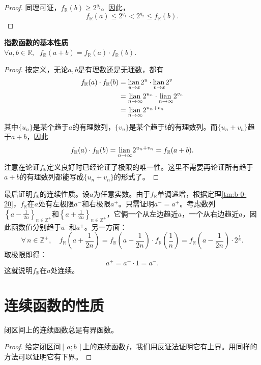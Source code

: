 \documentclass[12pt,UTF8]{ctexbook}
\begin{document}
\begin{appendix}
\begin{proof}
    同理可证，$f_{\mathbb{R}} (b)\geqslant 2^{q_2}$。因此，
    $$ f_{\mathbb{R}} (a)\leqslant 2^{q_1} < 2^{q_2} \leqslant f_{\mathbb{R}} (b). $$
\end{proof}

\begin{tm}{\textbf{指数函数的基本性质}}\\
    $ \forall a, b \in \mathbb{R}, \;\,\, f_{\mathbb{R}}(a + b) = f_{\mathbb{R}}(a) \cdot f_{\mathbb{R}}(b).$
\end{tm}

\begin{proof}
    按定义，无论$a,b$是有理数还是无理数，都有
    \begin{align*}
         f_{\mathbb{R}}(a) \cdot f_{\mathbb{R}}(b) &= \underset{u \to x}{\operatorname{lian}\,} 2^u \cdot \underset{v \to x}{\operatorname{lian}\,} 2^v \\
         &= \underset{n\to\infty}{\operatorname{lian}\,} 2^{u_n} \cdot \underset{n\to\infty}{\operatorname{lian}\,} 2^{v_n} \\
         &= \underset{n\to\infty}{\operatorname{lian}\,} 2^{u_n+v_n}
    \end{align*}
    其中$\{u_n\}$是某个趋于$a$的有理数列，$\{v_n\}$是某个趋于$b$的有理数列。而$\{u_n+v_n\}$趋于$a+b$，因此
    $$f_{\mathbb{R}}(a) \cdot f_{\mathbb{R}}(b) = \underset{n\to\infty}{\operatorname{lian}\,} 2^{u_n+v_n} = f_{\mathbb{R}}(a + b).$$
    注意在论证$f_{\mathbb{R}}$定义良好时已经论证了极限的唯一性。这里不需要再论证所有趋于$a+b$的有理数列都能写成$\{u_n+v_n\}$的形式了。
\end{proof}

最后证明$f_{\mathbb{R}}$的连续性质。设$a$为任意实数。由于$f_{\mathbb{R}}$单调递增，根据定理\ref{tm:b-0-20}，$f_{\mathbb{R}}$在$a$处有左极限$a^-$和右极限$a^+$。只需证明$a^-=a^+$。考虑数列$\left\{a-\frac{1}{2n}\right\}_{n\in \mathbb{Z}^+}$和$\left\{a+\frac{1}{2n}\right\}_{n\in \mathbb{Z}^+}$，它俩一个从左边趋近$a$，一个从右边趋近$a$，因此函数值分别趋于$a^-$和$a^+$。另一方面：
$$ \forall \, n\in \mathbb{Z}^+,\quad f_{\mathbb{R}} \left(a+\frac{1}{2n}\right) = f_{\mathbb{R}} \left(a - \frac{1}{2n}\right) \cdot f_{\mathbb{R}} \left(\frac{1}{n}\right) = f_{\mathbb{R}} \left(a - \frac{1}{2n}\right) \cdot  2^{\frac{1}{n}}.   $$
取极限即得：
$$ a^+ = a^- \cdot 1 = a^-.$$
这就说明$f_{\mathbb{R}}$在$a$处连续。


\section{连续函数的性质}

\begin{tm}\label{tm:b-1-0}
    闭区间上的连续函数总是有界函数。
\end{tm}
\begin{proof}
    给定闭区间$[\,a; b\,]$上的连续函数$f$，我们用反证法证明它有上界。用同样的方法可以证明它有下界。


\end{proof}
\end{appendix}
\end{document}
